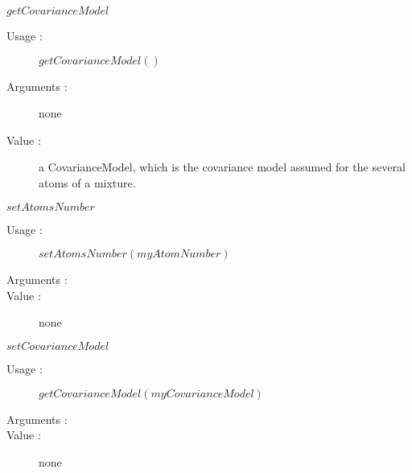 \begin{description}
\begin{description}
  \item $getCovarianceModel$
    \begin{description}
    \item[Usage :]  $getCovarianceModel()$
    \item[Arguments :]  none
    \item[Value :]  a CovarianceModel, which is the covariance model assumed for the several atoms of a mixture.
    \end{description}


  \item $setAtomsNumber$
    \begin{description}
    \item[Usage :]  $setAtomsNumber(myAtomNumber)$
    \item[Arguments :]  \strut
    \item[Value :]  none
    \end{description}

  \item $setCovarianceModel$
    \begin{description}
    \item[Usage :]  $getCovarianceModel(myCovarianceModel)$
    \item[Arguments :]  \strut
    \item[Value :]  none
    \end{description}


  \end{description}

\end{description}